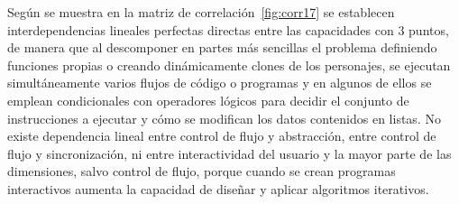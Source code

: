 \documentclass[a4paper, 12pt]{book}
\begin{document}
Según se muestra en la matriz de correlación~\ref{fig:corr17}
se establecen interdependencias lineales perfectas directas entre las capacidades con 3 puntos, de manera que al descomponer en partes más sencillas el problema definiendo funciones propias o creando dinámicamente clones de los personajes, 
se ejecutan simultáneamente varios flujos de código o programas y en algunos de ellos se emplean condicionales con operadores lógicos para decidir el conjunto de instrucciones a ejecutar y cómo se modifican los datos contenidos en listas.
No existe dependencia lineal entre control de flujo y abstracción, entre control de flujo y sincronización, ni entre interactividad del usuario y la mayor parte de las dimensiones, salvo control de flujo, porque cuando se crean programas interactivos aumenta la capacidad de diseñar y aplicar algoritmos iterativos.
\end{document}
